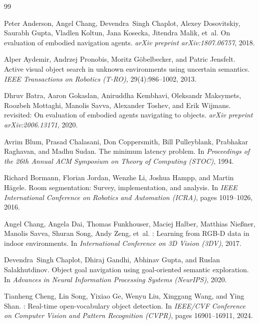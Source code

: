 \documentclass[10pt]{article}
\begin{document}
\begin{thebibliography}{99}
\small

Peter Anderson, Angel Chang, Devendra~Singh Chaplot, Alexey Dosovitskiy, Saurabh Gupta, Vladlen Koltun, Jana Kosecka, Jitendra Malik, et~al.
\newblock On evaluation of embodied navigation agents.
\newblock \emph{arXiv preprint arXiv:1807.06757}, 2018.

Alper Aydemir, Andrzej Pronobis, Moritz G{\"o}belbecker, and Patric Jensfelt.
\newblock Active visual object search in unknown environments using uncertain semantics.
\newblock \emph{IEEE Transactions on Robotics (T-RO)}, 29(4):986--1002, 2013.

Dhruv Batra, Aaron Gokaslan, Aniruddha Kembhavi, Oleksandr Maksymets, Roozbeh Mottaghi, Manolis Savva, Alexander Toshev, and Erik Wijmans.
 revisited: On evaluation of embodied agents navigating to objects.
\newblock \emph{arXiv preprint arXiv:2006.13171}, 2020.

Avrim Blum, Prasad Chalasani, Don Coppersmith, Bill Pulleyblank, Prabhakar Raghavan, and Madhu Sudan.
\newblock The minimum latency problem.
\newblock In \emph{Proceedings of the 26th Annual ACM Symposium on Theory of Computing (STOC)}, 1994.

Richard Bormann, Florian Jordan, Wenzhe Li, Joshua Hampp, and Martin H\"{a}gele.
\newblock Room segmentation: Survey, implementation, and analysis.
\newblock In \emph{IEEE International Conference on Robotics and Automation (ICRA)}, pages 1019--1026, 2016.

Angel Chang, Angela Dai, Thomas Funkhouser, Maciej Halber, Matthias Nie{\ss}ner, Manolis Savva, Shuran Song, Andy Zeng, et~al.
: Learning from {RGB-D} data in indoor environments.
\newblock In \emph{International Conference on 3D Vision (3DV)}, 2017.

Devendra~Singh Chaplot, Dhiraj Gandhi, Abhinav Gupta, and Ruslan Salakhutdinov.
\newblock Object goal navigation using goal-oriented semantic exploration.
\newblock In \emph{Advances in Neural Information Processing Systems (NeurIPS)}, 2020.

Tianheng Cheng, Lin Song, Yixiao Ge, Wenyu Liu, Xinggang Wang, and Ying Shan.
: Real-time open-vocabulary object detection.
\newblock In \emph{IEEE/CVF Conference on Computer Vision and Pattern Recognition (CVPR)}, pages 16901--16911, 2024.


\end{thebibliography}
\end{document}
